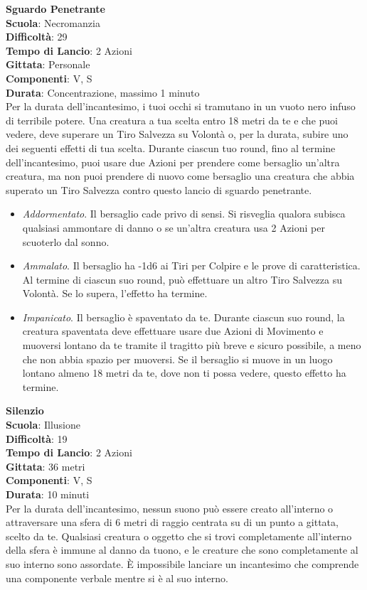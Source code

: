 \begin{multicols}{2}
\medskip\textbf{Sguardo Penetrante}\\
\textbf{Scuola}: Necromanzia\\
\textbf{Difficoltà}: 29\\
\textbf{Tempo di Lancio}: 2 Azioni\\
\textbf{Gittata}: Personale\\
\textbf{Componenti}: V, S\\
\textbf{Durata}: Concentrazione, massimo 1 minuto\\
Per la durata dell'incantesimo, i tuoi occhi si tramutano in un vuoto nero infuso di terribile potere. Una creatura a tua scelta entro 18 metri da te e che puoi vedere, deve superare un Tiro Salvezza su Volontà o, per la durata, subire uno dei seguenti effetti di tua scelta. Durante ciascun tuo round, fino al termine dell'incantesimo, puoi usare due Azioni per prendere come bersaglio un'altra creatura, ma non puoi prendere di nuovo come bersaglio una creatura che abbia superato un Tiro Salvezza contro questo lancio di sguardo penetrante.\\
\medskip
\begin{itemize}
\item
\textit{Addormentato}. Il bersaglio cade privo di sensi. Si risveglia qualora subisca qualsiasi ammontare di danno o se un'altra creatura usa 2 Azioni per scuoterlo dal sonno.
\item
\textit{Ammalato}. Il bersaglio ha -1d6 ai Tiri per Colpire e le prove di caratteristica. Al termine di ciascun suo round, può effettuare un altro Tiro Salvezza su Volontà. Se lo supera, l'effetto ha termine.
\item
\textit{Impanicato}. Il bersaglio è spaventato da te. Durante ciascun suo round, la creatura spaventata deve effettuare usare due Azioni di Movimento e muoversi lontano da te tramite il tragitto più breve e sicuro possibile, a meno che non abbia spazio per muoversi. Se il bersaglio si muove in un luogo lontano almeno 18 metri da te, dove non ti possa vedere, questo effetto ha termine.
\end{itemize}

\medskip\textbf{Silenzio}\\
\textbf{Scuola}: Illusione\\
\textbf{Difficoltà}: 19\\
\textbf{Tempo di Lancio}: 2 Azioni\\
\textbf{Gittata}: 36 metri\\
\textbf{Componenti}: V, S\\
\textbf{Durata}: 10 minuti\\
Per la durata dell'incantesimo, nessun suono può essere creato all'interno o attraversare una sfera di 6 metri di raggio centrata su di un punto a gittata, scelto da te. Qualsiasi creatura o oggetto che si trovi completamente all'interno della sfera è immune al danno da tuono, e le creature che sono completamente al suo interno sono assordate. È impossibile lanciare un incantesimo che comprende una componente verbale mentre si è al suo interno.


\end{multicols}
